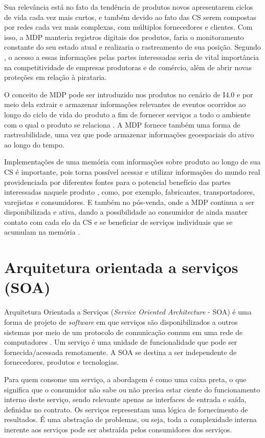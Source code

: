 Sua relevância está no fato da tendência de produtos novos apresentarem ciclos de vida cada vez mais curtos, e também devido ao fato das CS serem compostas por redes cada vez mais complexas, com múltiplos fornecedores e clientes. Com isso, a MDP manteria registros digitais dos produtos, faria o monitoramento constante do seu estado atual e realizaria o rastreamento de sua posição. Segundo , o acesso a essas informações pelas partes interessadas seria de vital importância na competitividade de empresas produtoras e de comércio, além de abrir novas proteções em relação à pirataria.

O conceito de MDP pode ser introduzido nos produtos no cenário de I4.0 e por meio dela extrair e armazenar informações relevantes de eventos ocorridos ao longo do ciclo de vida do produto a fim de fornecer serviços a todo o ambiente com o qual o produto se relaciona \cite{brandherm2011productmemory}. A MDP fornece também uma forma de rastreabilidade, uma vez que pode armazenar informações geoespaciais do ativo ao longo do tempo.

Implementações de uma memória com informações sobre produto ao longo de sua CS é importante, pois torna possível acessar e utilizar informações do mundo real providenciada por diferentes fontes para o potencial benefício das partes interessadas naquele produto \cite{brandherm2011productmemory}, como, por exemplo, fabricantes, transportadores, varejistas e consumidores. E também no pós-venda, onde a MDP continua a ser disponibilizada e ativa, dando a possibilidade ao consumidor de ainda manter contato com cada elo da CS e se beneficiar de serviços individuais que se acumulam na memória \cite{brandherm2011productmemory}.

\section{Arquitetura orientada a serviços (SOA)}
\label{sec:soa}

Arquitetura Orientada a Serviços (\textit{Service Oriented Architecture} - SOA) é uma forma de projeto de \textit{software} em que serviços são disponibilizados a outros sistemas por meio de um protocolo de comunicação comum em uma rede de computadores \cite{bell2008soa}. Um serviço é uma unidade de funcionalidade que pode ser fornecida/acessada remotamente. A SOA se destina a ser independente de fornecedores, produtos e tecnologias.

Para quem consome um serviço, a abordagem é como uma caixa preta, o que significa que o consumidor não sabe ou não precisa estar ciente do funcionamento interno deste serviço, sendo relevante apenas as interfaces de entrada e saída, definidas no contrato. Os serviços representam uma lógica de fornecimento de resultados. É uma abstração de problemas, ou seja, toda a complexidade interna inerente aos serviços pode ser abstraída pelos consumidores dos serviços.

